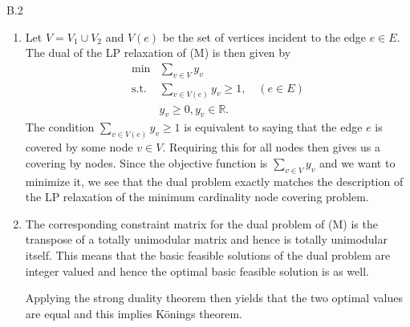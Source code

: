 \documentclass[a4paper]{article}
\begin{document}
\begin{exercise}{B.2}
\begin{enumerate}[label=(\roman*)]
\begin{equation*}
{            w_1       & f_{e_1}(w_1)       & f_{e_2}(w_1)       & f_{e_3}(w_1)       & \cdots & f_{e_{|E|}}(w_1)       & 0      & 0      & \cdots & 0 \\
            w_2       & f_{e_1}(w_2)       & f_{e_2}(w_2)       & f_{e_3}(w_2)       & \cdots & f_{e_{|E|}}(w_2)       & 0      & 0      & \cdots & 0 \\
            \vdots    & \vdots             & \vdots             & \vdots             & \vdots & \vdots                 & \vdots & \vdots & \vdots & \vdots \\
            w_{|V_2|} & f_{e_1}(w_{|V_2|}) & f_{e_2}(w_{|V_2|}) & f_{e_3}(w_{|V_2|}) & \cdots & f_{e_{|E|}}(w_{|V_2|}) & 0      & \cdots & 0      & 1 \\
          }
        .\end{equation*}
        We can then partition the rows of $ A $ based into two sets based on whether or not the corresponding vertex belongs to $ V_1 $ or $ V_2 $. By the remark on the function we have that this partition satisfies the requirement mentioned in the first exercise and so $ A $ must be totally unimodular.

        Adjoining the identity matrix to $ A $ gives us $ [A\quad S] $ which is still totally unimodular by the remark in the lecture notes. Hence the constraint matrix is totally unimodular.

      \item Let $ V = V_1 \cup V_2 $ and $ V(e) $ be the set of vertices incident to the edge $ e \in E $. The dual of the LP relaxation of (M) is then given by
        \begin{align*}
          \min & \sum_{v \in V} y_v \\
          \text{s.t. } &\sum_{v \in V(e)} y_v \geq 1, \quad (e \in E) \\
                       & y_v \geq 0, y_v \in \mathbb{R}
        .\end{align*}
        The condition $ \sum_{v \in V(e)} y_v \geq 1 $ is equivalent to saying that the edge $ e $ is covered by some node $ v \in V $. Requiring this for all nodes then gives us a covering by nodes. Since the objective function is $ \sum_{v \in V} y_v $ and we want to minimize it, we see that the dual problem exactly matches the description of the LP relaxation of the minimum cardinality node covering problem.

      \item The corresponding constraint matrix for the dual problem of (M) is the transpose of a totally unimodular matrix and hence is totally unimodular itself. This means that the basic feasible solutions of the dual problem are integer valued and hence the optimal basic feasible solution is as well.

      Applying the strong duality theorem then yields that the two optimal values are equal and this implies K\"onings theorem.
    \end{enumerate}
  \end{exercise}
\end{document}
